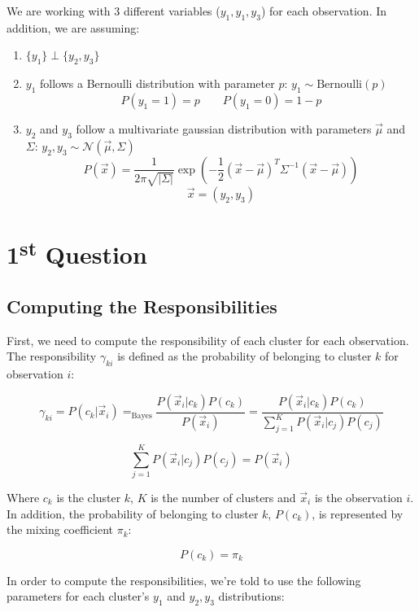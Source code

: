 \documentclass{article}
\begin{document}
We are working with 3 different variables ($y_1, y_1, y_3$) for each observation. 
In addition, we are assuming:
\begin{enumerate}
  \item $\{ y_1 \} \perp \{y_2, y_3\}$
  \item $y_1$ follows a Bernoulli distribution with parameter $p$: $y_1 \sim \text{Bernoulli}(p)$
  \[ P(y_1 = 1) = p \qquad P(y_1 = 0) = 1 - p \]
  \item $y_2$ and $y_3$ follow a multivariate gaussian distribution with parameters $\vec{\mu}$ and $\Sigma$: $y_2, y_3 \sim \mathcal{N}(\vec{\mu}, \Sigma)$
  \[ P(\vec{x}) = \frac{1}{2\pi \sqrt{|\Sigma|}} \exp \left( -\frac{1}{2} (\vec{x} - \vec{\mu})^T \Sigma^{-1} (\vec{x} - \vec{\mu}) \right) \]
  \[ \vec{x} = ( y_2, y_3) \]
\end{enumerate}

\newpage

\section*{1\textsuperscript{st} Question}

\subsection*{Computing the Responsibilities}

First, we need to compute the responsibility of each cluster for each observation. The responsibility $\gamma_{ki}$ is defined as the probability of belonging to cluster $k$ for observation $i$:

\[ \gamma_{ki} = P(c_k | \vec{x}_i) =_{\text{Bayes}} \frac{P(\vec{x}_i | c_k) P(c_k)}{P(\vec{x}_i)} = \frac{P(\vec{x}_i | c_k) P(c_k)}{\sum_{j=1}^K P(\vec{x}_i | c_j) P(c_j)} \]

\[ \sum_{j=1}^K P(\vec{x}_i | c_j) P(c_j) = P(\vec{x}_i) \]

Where $c_k$ is the cluster $k$, $K$ is the number of clusters and $\vec{x}_i$ is the observation $i$. In addition, the probability of belonging to cluster $k$, $P(c_k)$, is represented by the mixing coefficient $\pi_k$:

\[ P(c_k) = \pi_k \]

In order to compute the responsibilities, we're told to use the following parameters for each cluster's $y_1$ and $y_2, y_3$ distributions:
\end{document}
